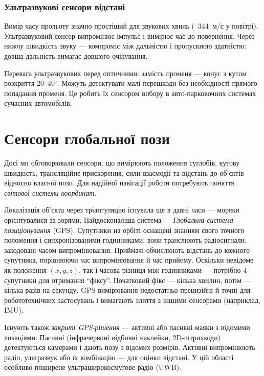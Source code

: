 \subsubsection{Ультразвукові сенсори відстані}\label{sec:sensors:sound}
Вимір часу прольоту значно простіший для звукових хвиль (~344~м/с у повітрі). Ультразвуковий сенсор випромінює імпульс і вимірює час до повернення.
Через нижчу швидкість звуку — компроміс між дальністю і пропускною здатністю: довша дальність вимагає довшого очікування.

Перевага ультразвукових перед оптичними: замість променя — конус з кутом розкриття $20$--$40^\circ$. Можуть детектувати малі перешкоди без необхідності прямого попадання променя. Це робить їх сенсором вибору в авто-парковочних системах сучасних автомобілів.

\section{Сенсори глобальної пози}\label{sec:sensors:globalpose}
Досі ми обговорювали сенсори, що вимірюють положення суглобів, кутову швидкість, трансляційне прискорення, сили взаємодії та відстань до об'єктів відносно власної пози. Для надійної навігації роботи потребують поняття \emph{світової системи координат}.

Локалізація об'єкта через тріангуляцію існувала ще в давні часи — моряки орієнтувалися за зорями. Найдосконаліша система — \emph{Глобальна система позиціонування} (GPS). Супутники на орбіті оснащені знанням свого точного положення і синхронізованими годинниками; вони транслюють радіосигнали, закодовані часом випромінювання. Приймачі обчислюють відстань до кожного супутника, порівнюючи час випромінювання й час прийому. Оскільки невідоме як положення $(x,y,z)$, так і часова різниця між годинниками — потрібно 4 супутники для отримання ``фіксу''. Початковий фікс — кілька хвилин, потім — кілька разів на секунду. GPS-вимірювання недостатньо прецизійні й точні для робототехнічних застосувань і вимагають злиття з іншими сенсорами (наприклад, IMU).

Існують також \emph{закриті GPS-рішення} — активні або пасивні маяки з відомими локаціями. Пасивні (інфрачервоні відбивні наклейки, 2D-штрихкоди) детектуються камерами і дають позу з відомих розмірів. Активні випромінюють радіо, ультразвук або їх комбінацію — для оцінки відстані. У цій області особливо поширене ультраширокосмугове радіо (UWB).

